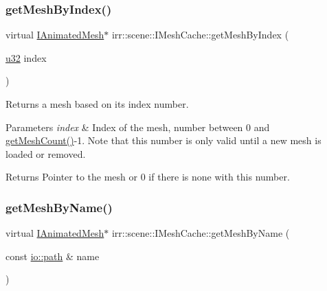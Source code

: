 \subsubsection{\texorpdfstring{get\+Mesh\+By\+Index()}{getMeshByIndex()}}
{\footnotesize\ttfamily virtual \hyperlink{classirr_1_1scene_1_1IAnimatedMesh}{I\+Animated\+Mesh}$\ast$ irr\+::scene\+::\+I\+Mesh\+Cache\+::get\+Mesh\+By\+Index (\begin{DoxyParamCaption}\item[{\hyperlink{namespaceirr_a0416a53257075833e7002efd0a18e804}{u32}}]{index }\end{DoxyParamCaption})\hspace{0.3cm}{\ttfamily [pure virtual]}}



Returns a mesh based on its index number. 


\begin{DoxyParams}{Parameters}
{\em index} & Index of the mesh, number between 0 and \hyperlink{classirr_1_1scene_1_1IMeshCache_a9dc99e46309a6ef494ef7672c9b49853}{get\+Mesh\+Count()}-\/1. Note that this number is only valid until a new mesh is loaded or removed. \\
\hline
\end{DoxyParams}
\begin{DoxyReturn}{Returns}
Pointer to the mesh or 0 if there is none with this number. 
\end{DoxyReturn}
\mbox{\label{classirr_1_1scene_1_1IMeshCache_a4c93e736bdca8c84d478afc82540d6bb}} 
\subsubsection{\texorpdfstring{get\+Mesh\+By\+Name()}{getMeshByName()}}
{\footnotesize\ttfamily virtual \hyperlink{classirr_1_1scene_1_1IAnimatedMesh}{I\+Animated\+Mesh}$\ast$ irr\+::scene\+::\+I\+Mesh\+Cache\+::get\+Mesh\+By\+Name (\begin{DoxyParamCaption}\item[{const \hyperlink{namespaceirr_1_1io_ab1bdc45edb3f94d8319c02bc0f840ee1}{io\+::path} \&}]{name }\end{DoxyParamCaption})\hspace{0.3cm}{\ttfamily [pure virtual]}}



